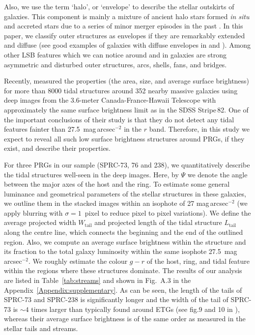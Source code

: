\documentclass{raa}
\begin{document}
Also, we use the term `halo', or `envelope' to describe the stellar outskirts of galaxies. This component is mainly a mixture of ancient halo stars formed \textit{in situ} \citep{2011MNRAS.416.2802F,2012MNRAS.420.2245M,2015MNRAS.454.3185C} and accreted stars due to a series of minor merger episodes in the past \citep{2010MNRAS.406..744C,2013MNRAS.434.3348C}. In this paper, we classify outer structures as envelopes if they are remarkably extended and diffuse (see good examples of galaxies with diffuse envelopes in \citealt{2019MNRAS.490.1539R} and \citealt{2020MNRAS.494.1751M}). Among other LSB features which we can notice around and in galaxies are strong asymmetric and disturbed outer structures, arcs, shells, fans, and bridges.

Recently, \citep{2022arXiv220303973S} measured the properties (the area, size, and average surface brightness) for more than 8000 tidal structures around 352 nearby massive galaxies using deep images from the 3.6-meter Canada-France-Hawaii Telescope with approximately the same surface brightness limit as in the SDSS Stripe\,82. One of the important conclusions of their study is that they do not detect any tidal features fainter than 27.5~mag\,arcsec$^{-2}$ in the $r$ band. Therefore, in this study we expect to reveal all such low surface brightness structures around PRGs, if they exist, and describe their properties.

For three PRGs in our sample (SPRC-73, 76 and 238), we quantitatively describe the tidal structures well-seen in the deep images. Here, by $\Psi$ we denote the angle between the major axes of the host and the ring. To estimate some general luminance and geometrical parameters of the stellar structures in these galaxies, we outline them in the stacked images within an isophote of 27 mag\,arcsec$^{-2}$ (we apply blurring with $\sigma=1$~pixel to reduce pixel to pixel variations). We define the average projected width $W_\mathrm{tail}$ and projected length of the tidal structure $L_\mathrm{tail}$ along the centre line, which connects the beginning and the end of the outlined region.  Also, we compute an average surface brightness within the structure and its fraction to the total galaxy luminosity within the same isophote 27.5~mag\,arcsec$^{-2}$. We roughly estimate the colour $g-r$ of the host, ring, and tidal feature within the regions where these structures dominate. The results of our analysis are listed in Table~\ref{tab:streams} and shown in Fig.~A.3 in the Appendix~\ref{Appendix:supplementary}.  As can be seen, the length of the tails of SPRC-73 and SPRC-238 is significantly longer and the width of the tail of SPRC-73 is $\sim4$ times larger than typically found around ETGs (see fig.9 and 10 in \citealt{2022arXiv220303973S}), whereas their average surface brightness is of the same order as measured in the stellar tails and streams.
\end{document}
